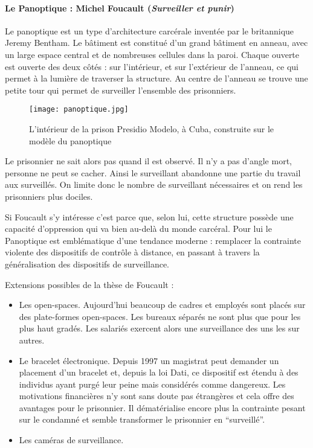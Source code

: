 	\paragraph{Le Panoptique : Michel Foucault (\textit{Surveiller et punir})}

	Le panoptique est un type d'architecture carcérale inventée par le britannique Jeremy Bentham.
	Le bâtiment est constitué d'un grand bâtiment en anneau, avec un large espace central et de nombreuses cellules dans la paroi.
	Chaque ouverte est ouverte des deux côtés : sur l'intérieur, et sur l'extérieur de l'anneau, ce qui permet à la lumière de traverser la structure.
	Au centre de l'anneau se trouve une petite tour qui permet de surveiller l'ensemble des prisonniers.
	
	\begin{figure}[htp]
	\centering
	\texttt{[image: panoptique.jpg]}
	\caption{L'intérieur de la prison Presidio Modelo, à Cuba, construite sur le modèle du panoptique}
	\end{figure}

	Le prisonnier ne sait alors pas quand il est observé.
	Il n'y a pas d'angle mort, personne ne peut se cacher.
	Ainsi le surveillant abandonne une partie du travail aux surveillés.
	On limite donc le nombre de surveillant nécessaires et on rend les prisonniers plus dociles.

	Si Foucault s'y intéresse c'est parce que, selon lui, cette structure possède une capacité d'oppression qui va bien au-delà du monde carcéral.
	Pour lui le Panoptique est emblématique d'une tendance moderne : remplacer la contrainte violente des dispositifs de contrôle à distance, en passant à travers la généralisation des dispositifs de surveillance.

	Extensions possibles de la thèse de Foucault :
	\begin{itemize}
		\item Les open-spaces. Aujourd'hui beaucoup de cadres et employés sont placés sur des plate-formes open-spaces. Les bureaux séparés ne sont plus que pour les plus haut gradés.
			Les salariés exercent alors une surveillance des uns les sur autres.
		\item Le bracelet électronique. Depuis 1997 un magistrat peut demander un placement d'un bracelet et, depuis la loi Dati, ce dispositif est étendu à des individus ayant purgé leur peine mais considérés comme dangereux.
			Les motivations financières n'y sont sans doute pas étrangères et cela offre des avantages pour le prisonnier.
			Il dématérialise encore plus la contrainte pesant sur le condamné et semble transformer le prisonnier en “surveillé”.
		\item Les caméras de surveillance.
	\end{itemize}
